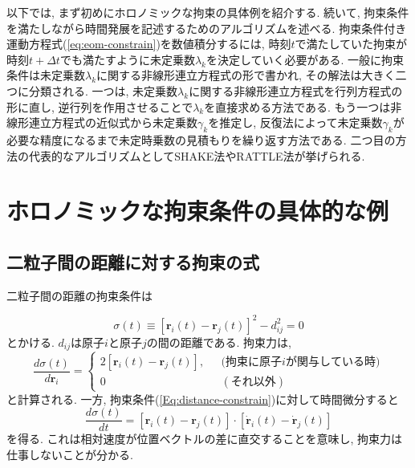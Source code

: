 以下では, まず初めにホロノミックな拘束の具体例を紹介する. 
続いて, 拘束条件を満たしながら時間発展を記述するためのアルゴリズムを述べる. 
拘束条件付き運動方程式(\ref{eq:eom-constrain})を数値積分するには, 時刻$t$で満たしていた拘束が時刻$t + \Delta t$でも満たすように未定乗数$\lambda_{k}$を決定していく必要がある. 
一般に拘束条件は未定乗数$\lambda_{k}$に関する非線形連立方程式の形で書かれ, その解法は大きく二つに分類される. 
一つは, 未定乗数$\lambda_{k}$に関する非線形連立方程式を行列方程式の形に直し, 逆行列を作用させることで$\lambda_{k}$を直接求める方法である. 
もう一つは非線形連立方程式の近似式から未定乗数$\gamma_{k}$を推定し, 反復法によって未定乗数$\gamma_{k}$が必要な精度になるまで未定時乗数の見積もりを繰り返す方法である. 
二つ目の方法の代表的なアルゴリズムとしてSHAKE法\cite{1977Ryckaert}やRATTLE法\cite{1980Andersen}が挙げられる. 


\section{ホロノミックな拘束条件の具体的な例}
\subsection{二粒子間の距離に対する拘束の式}
二粒子間の距離の拘束条件は

\begin{equation}
    \sigma(t)  \equiv [\bm{r}_{i}(t) - \bm{r}_{j}(t)]^{2} - d_{ij}^2 = 0
    \label{Eq:distance-constrain}
\end{equation}
とかける. $d_{ij}$は原子$i$と原子$j$の間の距離である. 拘束力は, 
\begin{equation}
    \frac{d\sigma(t)}{d\bm{r}_{i}} =
    \begin{cases}
        2 \left[ \bm{r}_{i}(t) - \bm{r}_{j} (t) \right], ~~~&\mathrm{(拘束に原子}i\mathrm{が関与している時)} \\
        0 ~~~&\mathrm{(それ以外)}
    \end{cases}
\end{equation}
と計算される. 
一方, 拘束条件(\ref{Eq:distance-constrain})に対して時間微分すると
\begin{equation}
    \frac{d\sigma(t)}{dt} =
    \left[\bm{r}_{i}(t) - \bm{r}_{j} (t)\right] \cdot
    \left[\dot{\bm{r}}_{i}(t) - \dot{\bm{r}}_{j} (t)\right]
\end{equation}
を得る. これは相対速度が位置ベクトルの差に直交することを意味し, 拘束力は仕事しないことが分かる. 


